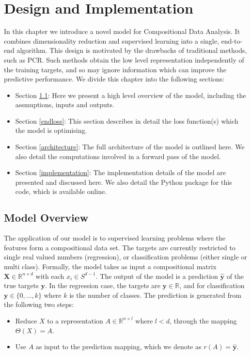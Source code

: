 \chapter{Design and Implementation}
\label{design}
In this chapter we introduce a novel model for Compositional Data Analysis. It combines dimensionality reduction and supervised learning into a single, end-to-end algorithm. This design is motivated by the drawbacks of traditional methods, such as PCR. Such methods obtain the low level representation independently of the training targets, and so may ignore information which can improve the predictive performance. We divide this chapter into the following sections: 

\begin{itemize}
    \item Section \ref{design}: Here we present a high level overview of the model, including the assmuptions, inputs and outputs. 
    \item Section  \ref{endloss}: This section describes in detail the loss function(s) which the model is optimising.
    \item Section \ref{architecture}: The full architecture of the model is outlined here. We also detail the computations involved in a forward pass of the model. 
    \item Section \ref{implementation}: The implementation details of the model are presented and discussed here. We also detail the Python package for this code, which is available online.
\end{itemize}
\pagebreak



\section{Model Overview}
\label{design}
The application of our model is to supervised learning problems where the features form a compositional data set. The targets are currently restricted to single real valued numbers (regression), or classification problems (either single or multi class). Formally, the model takes as input a compositional matrix $\mathbf{X} \in \mathbb{R}^{n \times d}$ with each $x_i \in S^{d-1}$.  The output of the model is a prediction $\hat{\mathbf{y}}$ of the true targets $\mathbf{y}$. In the regression case, the targets are $\mathbf{y} \in \mathbb{R}$, and for classification $\mathbf{y} \in \{0, ..., k\}$ where $k$ is the number of classes. The prediction is generated from the following two steps:
\begin{itemize}
    \item Reduce $X$ to a representation $A \in \mathbb{R}^{n \times l}$ where $l < d$, through the mapping $\Theta(X) = A$.
    \item Use $A$ as input to the prediction mapping, which we denote as $r(A) = \mathbf{\hat{y}}$.
\end{itemize}

